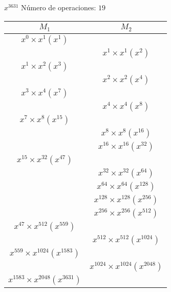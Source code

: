 \documentclass{article}
\begin{document}
\begin{multicols}{2}
         $x^{3631}$ Número de operaciones: $19$ \\
        \begin{tabular}{|c|c|}
         \hline
           $M_1$  & $M_2$ \\ \hline
        $x^{0} \times x^{1} (x^{1})$& \\ \hline
        & $x^{1} \times x^{1} (x^{2})$ \\ \hline 
        $x^{1} \times x^{2} (x^{3})$& \\ \hline
        & $x^{2} \times x^{2} (x^{4})$ \\ \hline 
        $x^{3} \times x^{4} (x^{7})$& \\ \hline
        & $x^{4} \times x^{4} (x^{8})$ \\ \hline 
        $x^{7} \times x^{8} (x^{15})$& \\ \hline
        & $x^{8} \times x^{8} (x^{16})$ \\ \hline 
        & $x^{16} \times x^{16} (x^{32})$ \\ \hline 
        $x^{15} \times x^{32} (x^{47})$& \\ \hline
        & $x^{32} \times x^{32} (x^{64})$ \\ \hline 
        & $x^{64} \times x^{64} (x^{128})$ \\ \hline 
        & $x^{128} \times x^{128} (x^{256})$ \\ \hline 
        & $x^{256} \times x^{256} (x^{512})$ \\ \hline 
        $x^{47} \times x^{512} (x^{559})$& \\ \hline
        & $x^{512} \times x^{512} (x^{1024})$ \\ \hline 
        $x^{559} \times x^{1024} (x^{1583})$& \\ \hline
        & $x^{1024} \times x^{1024} (x^{2048})$ \\ \hline 
        $x^{1583} \times x^{2048} (x^{3631})$& \\ \hline
    \end{tabular}\\
        \end{multicols}
\end{document}
